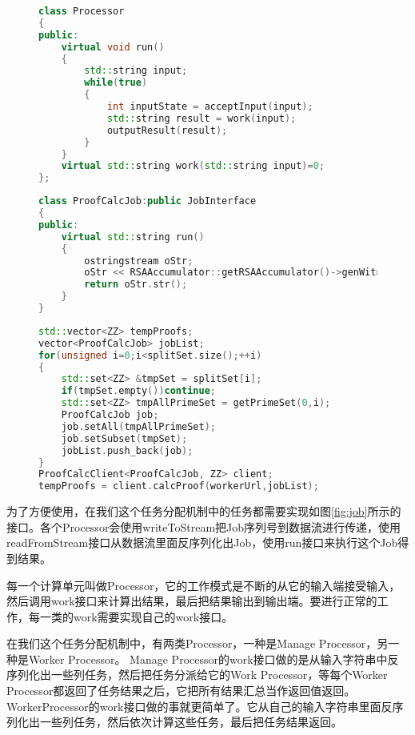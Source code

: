 \begin{figure}[htb]
\begin{lstlisting}[language=C++] 
class Processor
{
public:
    virtual void run()
    {
        std::string input;
        while(true)
        {
            int inputState = acceptInput(input);
            std::string result = work(input);
            outputResult(result);
        }
    }
    virtual std::string work(std::string input)=0;
};
\end{lstlisting}
\end{figure}
\begin{figure}[htb]
\begin{lstlisting}[language=C++] 
class ProofCalcJob:public JobInterface
{
public:
    virtual std::string run()
    {
        ostringstream oStr;
        oStr << RSAAccumulator::getRSAAccumulator()->genWitness(allSet, subset);
        return oStr.str();
    }
}
\end{lstlisting}
\end{figure}

\begin{figure}[htb]
\begin{lstlisting}[language=C++] 
std::vector<ZZ> tempProofs;
vector<ProofCalcJob> jobList;
for(unsigned i=0;i<splitSet.size();++i)
{
    std::set<ZZ> &tmpSet = splitSet[i];
    if(tmpSet.empty())continue;
    std::set<ZZ> tmpAllPrimeSet = getPrimeSet(0,i);
    ProofCalcJob job;
    job.setAll(tmpAllPrimeSet);
    job.setSubset(tmpSet);
    jobList.push_back(job);
}
ProofCalcClient<ProofCalcJob, ZZ> client;
tempProofs = client.calcProof(workerUrl,jobList);
\end{lstlisting}
\end{figure}

为了方便使用，在我们这个任务分配机制中的任务都需要实现如图\ref{fig:job}所示的接口。各个Processor会使用writeToStream把Job序列号到数据流进行传递，使用readFromStream接口从数据流里面反序列化出Job，使用run接口来执行这个Job得到结果。

每一个计算单元叫做Processor，它的工作模式是不断的从它的输入端接受输入，然后调用work接口来计算出结果，最后把结果输出到输出端。要进行正常的工作，每一类的work需要实现自己的work接口。

在我们这个任务分配机制中，有两类Processor，一种是Manage Processor，另一种是Worker Processor。
Manage Processor的work接口做的是从输入字符串中反序列化出一些列任务，然后把任务分派给它的Work Processor，等每个Worker Processor都返回了任务结果之后，它把所有结果汇总当作返回值返回。
WorkerProcessor的work接口做的事就更简单了。它从自己的输入字符串里面反序列化出一些列任务，然后依次计算这些任务，最后把任务结果返回。

